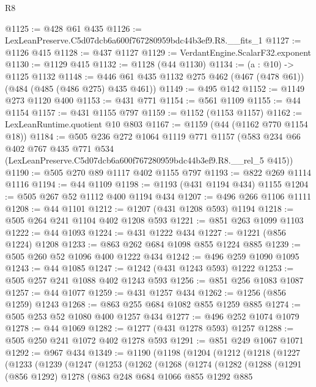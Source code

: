 \begin{lexlean}{R8}
\begin{coremodule}
@1125 := @428 @61 @435
@1126 := LexLeanPreserve.C5d07dcb6a600f767280959bdc44b3ef9.R8.__fits_1
@1127 := @1126 @415
@1128 := @437 @1127
@1129 := VerdantEngine.ScalarF32.exponent
@1130 := @1129 @415
@1132 := @1128 (@44 @1130)
@1134 := (a : @10) -> @1125 @1132
@1148 := @446 @61 @435 @1132 @275 @462 (@467 (@478 @61)) (@484 (@485 (@486 @275) @435 @461))
@1149 := @495 @142
@1152 := @1149 @273 @1120 @400
@1153 := @431 @771
@1154 := @561 @1109
@1155 := @44 @1154
@1157 := @431 @1155 @797
@1159 := @1152 (@1153 @1157)
@1162 := LexLeanRuntime.quotient @10 @803
@1167 := @1159 (@44 (@1162 @770 @1154 @18))
@1184 := @505
    @236
    @272
    @1064
    @1119
    @771
    @1157
    (@583
      @234
      @66
      @402
      @767
      @435
      @771
      @534
      (LexLeanPreserve.C5d07dcb6a600f767280959bdc44b3ef9.R8.__rel_5 @415))
@1190 := @505 @270 @89 @1117 @402 @1155 @797
@1193 := @822 @269 @1114 @1116
@1194 := @44 @1109
@1198 := @1193 (@431 @1194 @434) @1155
@1204 := @505 @267 @52 @1112 @400 @1194 @434
@1207 := @496 @266 @1106 @1111
@1208 := @44 @1101
@1212 := @1207 (@431 @1208 @593) @1194
@1218 := @505 @264 @241 @1104 @402 @1208 @593
@1221 := @851 @263 @1099 @1103
@1222 := @44 @1093
@1224 := @431 @1222 @434
@1227 := @1221 (@856 @1224) @1208
@1233 := @863 @262 @684 @1098 @855 @1224 @885
@1239 := @505 @260 @52 @1096 @400 @1222 @434
@1242 := @496 @259 @1090 @1095
@1243 := @44 @1085
@1247 := @1242 (@431 @1243 @593) @1222
@1253 := @505 @257 @241 @1088 @402 @1243 @593
@1256 := @851 @256 @1083 @1087
@1257 := @44 @1077
@1259 := @431 @1257 @434
@1262 := @1256 (@856 @1259) @1243
@1268 := @863 @255 @684 @1082 @855 @1259 @885
@1274 := @505 @253 @52 @1080 @400 @1257 @434
@1277 := @496 @252 @1074 @1079
@1278 := @44 @1069
@1282 := @1277 (@431 @1278 @593) @1257
@1288 := @505 @250 @241 @1072 @402 @1278 @593
@1291 := @851 @249 @1067 @1071
@1292 := @967 @434
@1349 := @1190
    (@1198
      (@1204
        (@1212
          (@1218
            (@1227
              (@1233
                (@1239
                  (@1247
                    (@1253
                      (@1262
                        (@1268
                          (@1274
                            (@1282
                              (@1288
                                (@1291
                                  (@856 @1292)
                                  @1278
                                  (@863
                                    @248
                                    @684
                                    @1066
                                    @855
                                    @1292
                                    @885

\end{coremodule}
\end{lexlean}
